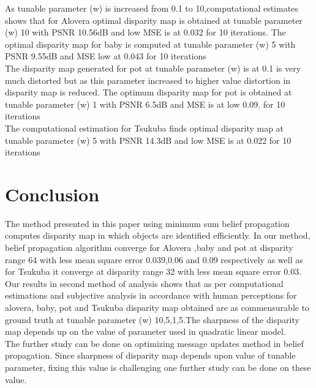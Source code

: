 \documentclass{singlecol-new}
\theoremstyle{TH}{
\newtheorem{lemma}{Lemma}
\newtheorem{theorem}[lemma]{Theorem}
\newtheorem{corrolary}[lemma]{Corrolary}
\newtheorem{conjecture}[lemma]{Conjecture}
\newtheorem{proposition}[lemma]{Proposition}
\newtheorem{claim}[lemma]{Claim}
\newtheorem{stheorem}[lemma]{Wrong Theorem}
\newtheorem{algorithm}{Algorithm}
}
\theoremstyle{THrm}{
\newtheorem{definition}{Definition}[section]
\newtheorem{question}{Question}[section]
\newtheorem{remark}{Remark}
\newtheorem{scheme}{Scheme}
}
\theoremstyle{THhit}{
\newtheorem{case}{Case}[section]
}
\begin{document}
As tunable parameter (w) is increased from 0.1 to 10,computational estimates shows that for Alovera optimal disparity map is   obtained at tunable parameter (w) 10 with PSNR 10.56dB and  low MSE is at 0.032 for 10 iterations. The optimal disparity map for baby is computed at tunable parameter (w)  5 with PSNR 9.55dB and MSE  low at       0.043 for 10 iterations\\
The disparity map generated for pot at tunable parameter (w) is at 0.1 is very much distorted but as this parameter increased to higher value distortion in disparity map is reduced. The optimum disparity map for pot is obtained at tunable parameter (w) 1 with PSNR 6.5dB and MSE is at  low  0.09. for 10 iterations\\
The computational estimation for Tsukuba finds optimal disparity map at tunable parameter (w) 5 with PSNR 14.3dB and low  MSE is at 0.022    for 10 iterations








\section{Conclusion}
The method presented in this paper using minimum sum belief propagation computes disparity map in which objects are identified efficiently. In our method, belief propagation algorithm converge for Alovera ,baby and pot at disparity range 64 with less mean square error 0.039,0.06 and 0.09 respectively as well as  for Tsukuba it  converge at disparity range 32 with less mean square error 0.03.\\
Our results in second method of analysis shows that as per computational estimations and subjective analysis in accordance with  human perceptions for alovera, baby, pot and Tsukuba  disparity  map obtained  are as  commensurable to ground truth at tunable parameter (w) 10,5,1,5.The sharpness of the disparity map depends up on the value of parameter used in quadratic linear model.\\
The further study can be done on optimizing message updates method in belief propagation. Since sharpness of disparity map depends upon value of tunable parameter, fixing this value is challenging one further study can be done on these value.
\end{document}
